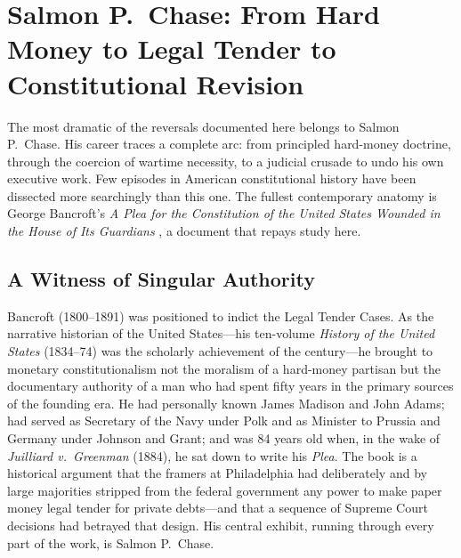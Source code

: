 \documentclass[12pt]{article}
\begin{document}
\section{Salmon P.~Chase: From Hard Money to Legal Tender to
         Constitutional Revision}

The most dramatic of the reversals documented here belongs
to Salmon P.\ Chase.  His career traces a complete arc: from principled
hard-money doctrine, through the coercion of wartime necessity, to a
judicial crusade to undo his own executive work.  Few episodes in
American constitutional history have been dissected more searchingly
than this one.  The fullest contemporary anatomy is George Bancroft's
\textit{A Plea for the Constitution of the United States Wounded in the
House of Its Guardians} \citep{Bancroft1886}, a document that repays
study here.

\subsection{A Witness of Singular Authority}

Bancroft (1800--1891) was positioned to indict the Legal Tender
Cases.  As the narrative historian of the United States---his
ten-volume \textit{History of the United States} (1834--74) was the
scholarly achievement of the century---he brought to monetary
constitutionalism not the moralism of a hard-money partisan but
the documentary authority of a man who had spent fifty years in the
primary sources of the founding era.  He had personally known James
Madison and John Adams; had served as Secretary of the Navy under Polk
and as Minister to Prussia and Germany under Johnson and Grant; and was
84 years old when, in the wake of \textit{Juilliard v.\ Greenman}
(1884), he sat down to write his \textit{Plea}.  The book is a
historical argument that the framers at Philadelphia had
deliberately and by large majorities stripped from the federal
government any power to make paper money legal tender for private
debts---and that a sequence of Supreme Court decisions had betrayed that
design.  His central exhibit, running through every part of the work,
is Salmon P.\ Chase.
\end{document}
